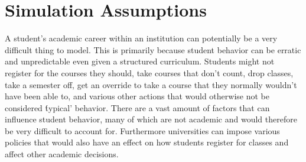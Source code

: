\documentclass[botnum, fleqn]{unmeethesis}
\begin{document}


  \section{Simulation Assumptions}
    A student's academic career within an institution can potentially be a very difficult thing to model. This is primarily because student behavior can be erratic and unpredictable even given a structured curriculum. Students might not register for the courses they should, take courses that don't count, drop classes, take a semester off, get an override to take a course that they normally wouldn't have been able to, and various other actions that would otherwise not be considered \'typical' behavior. There are a vast amount of factors that can influence student behavior, many of which are not academic and would therefore be very difficult to account for. Furthermore universities can impose various policies that would also have an effect on how students register for classes and affect other academic decisions. 
\end{document}
